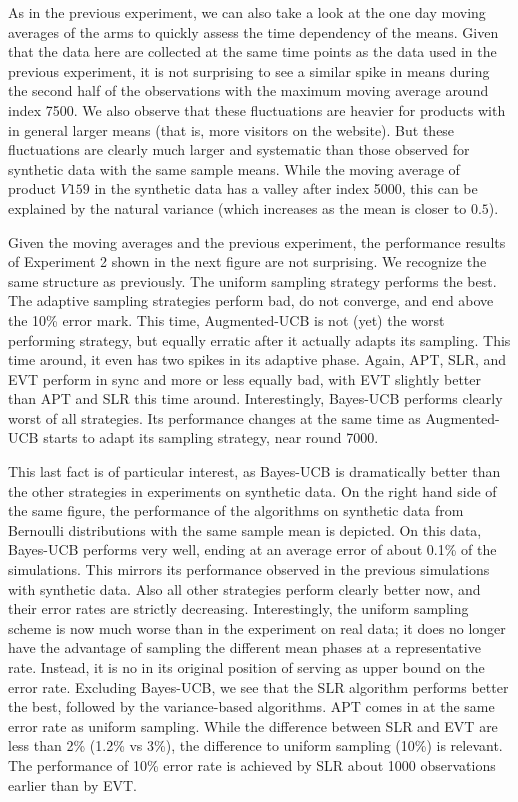 \documentclass[12pt,]{article}
\begin{document}
As in the previous experiment, we can also take a look at the one day
moving averages of the arms to quickly assess the time dependency of the
means. Given that the data here are collected at the same time points as
the data used in the previous experiment, it is not surprising to see a
similar spike in means during the second half of the observations with
the maximum moving average around index 7500. We also observe that these
fluctuations are heavier for products with in general larger means (that
is, more visitors on the website). But these fluctuations are clearly
much larger and systematic than those observed for synthetic data with
the same sample means. While the moving average of product \(V159\) in
the synthetic data has a valley after index 5000, this can be explained
by the natural variance (which increases as the mean is closer to
\(0.5\)).

Given the moving averages and the previous experiment, the performance
results of Experiment 2 shown in the next figure are not surprising. We
recognize the same structure as previously. The uniform sampling
strategy performs the best. The adaptive sampling strategies perform
bad, do not converge, and end above the 10\% error mark. This time,
Augmented-UCB is not (yet) the worst performing strategy, but equally
erratic after it actually adapts its sampling. This time around, it even
has two spikes in its adaptive phase. Again, APT, SLR, and EVT perform
in sync and more or less equally bad, with EVT slightly better than APT
and SLR this time around. Interestingly, Bayes-UCB performs clearly
worst of all strategies. Its performance changes at the same time as
Augmented-UCB starts to adapt its sampling strategy, near round 7000.

This last fact is of particular interest, as Bayes-UCB is dramatically
better than the other strategies in experiments on synthetic data. On
the right hand side of the same figure, the performance of the
algorithms on synthetic data from Bernoulli distributions with the same
sample mean is depicted. On this data, Bayes-UCB performs very well,
ending at an average error of about 0.1\% of the simulations. This
mirrors its performance observed in the previous simulations with
synthetic data. Also all other strategies perform clearly better now,
and their error rates are strictly decreasing. Interestingly, the
uniform sampling scheme is now much worse than in the experiment on real
data; it does no longer have the advantage of sampling the different
mean phases at a representative rate. Instead, it is no in its original
position of serving as upper bound on the error rate. Excluding
Bayes-UCB, we see that the SLR algorithm performs better the best,
followed by the variance-based algorithms. APT comes in at the same
error rate as uniform sampling. While the difference between SLR and EVT
are less than 2\% (1.2\% vs 3\%), the difference to uniform sampling
(10\%) is relevant. The performance of 10\% error rate is achieved by
SLR about 1000 observations earlier than by EVT.
\end{document}
